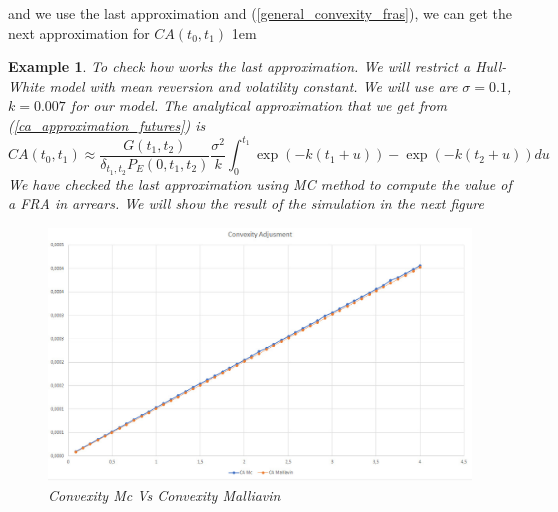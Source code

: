 \documentclass[a4paper,10pt]{article}
\newtheorem{example}[theorem]{Example}
\newcommand{\1}{\mathbf{1}}
\begin{document}
and we use the last approximation and (\ref{general_convexity_fras}), we can get the next approximation for $CA(t_0,t_1)$ 
\hspace{2cm}
\fboxsep1em
\begin{example}
To check how works the last approximation. We will restrict a Hull-White model with mean reversion and volatility constant. We will use are $\sigma=0.1$, $k=0.007$ for our model. The analytical approximation that we get from (\ref{ca_approximation_futures}) is
\begin{equation*}
CA(t_0,t_1) \approx \frac{G(t_1,t_2)}{\delta_{t_1,t_2}P_{E}(0,t_1,t_2)}  \frac{\sigma^{2}}{k} \int_{0}^{t_1} \exp(- k(t_1 + u)) -   \exp(- k(t_2 + u)) du 
\end{equation*}
We have checked the last approximation using MC method to compute the value of a FRA in arrears. We will show the result of the simulation in the next figure

\begin{figure}[h]
	\begin{center}
		\includegraphics[scale=0.3]{Figures/fra_convexity.jpg}
		\caption{Convexity Mc Vs Convexity Malliavin}
	\end{center}
\end{figure} 
 
\end{example}

\newpage
\end{document}
